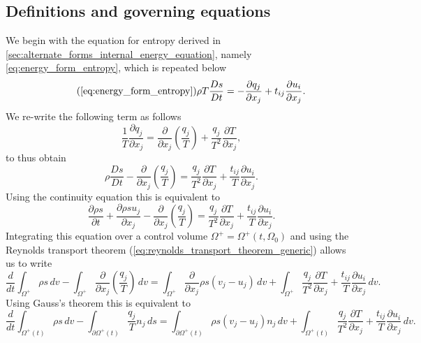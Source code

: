 \documentclass[oneside,a4paper,11pt]{report}
\begin{document}
\subsection{Definitions and governing equations}
We begin with the equation for entropy derived in \cref{sec:alternate_forms_internal_energy_equation}, namely \cref{eq:energy_form_entropy}, which is repeated below
\begin{equation}
\tag{\ref{eq:energy_form_entropy}}
    \rho T \frac{Ds}{Dt} = -\frac{\partial q_j}{\partial x_j} + t_{ij} \frac{\partial u_i}{\partial x_j}.
\end{equation}
We re-write the following term as follows
\begin{equation*}
    \frac{1}{T} \frac{\partial q_j}{\partial x_j} = \frac{\partial}{\partial x_j} \left ( \frac{q_j}{T} \right ) + \frac{q_j}{T^2}\frac{\partial T}{\partial x_j},
\end{equation*}
to thus obtain
\begin{equation*}
    \rho \frac{Ds}{Dt} - \frac{\partial}{\partial x_j} \left ( \frac{q_j}{T} \right ) = \frac{q_j}{T^2}\frac{\partial T}{\partial x_j} + \frac{t_{ij}}{T} \frac{\partial u_i}{\partial x_j}.
\end{equation*}
Using the continuity equation this is equivalent to
\begin{equation*}
    \frac{\partial \rho s}{\partial t} + \frac{\partial \rho s u_j}{\partial x_j} - \frac{\partial}{\partial x_j} \left ( \frac{q_j}{T} \right ) = \frac{q_j}{T^2}\frac{\partial T}{\partial x_j} + \frac{t_{ij}}{T} \frac{\partial u_i}{\partial x_j}.
\end{equation*}
Integrating this equation over a control volume $\Omega^+ = \Omega^+(t,\Omega_0)$ and using the Reynolds transport theorem (\cref{eq:reynolds_transport_theorem_generic}) allows us to write
\begin{equation*}
    \frac{d}{dt} \int_{\Omega^+} \rho s \, dv - \int_{\Omega^+} \frac{\partial}{\partial x_j} \left ( \frac{q_j}{T} \right ) \,dv = \int_{\Omega^+} \frac{\partial}{\partial x_j} \rho s \left (v_j - u_j \right ) \, dv + \int_{\Omega^+} \frac{q_j}{T^2}\frac{\partial T}{\partial x_j} + \frac{t_{ij}}{T} \frac{\partial u_i}{\partial x_j} \, dv.
\end{equation*}
Using Gauss's theorem this is equivalent to
\begin{equation*}
    \frac{d}{dt} \int_{\Omega^+(t)} \rho s \, dv - \int_{\partial \Omega^+(t)} \frac{q_j}{T} n_j \,ds = \int_{\partial \Omega^+(t)} \rho s \left (v_j - u_j \right ) n_j \, dv + \int_{\Omega^+(t)} \frac{q_j}{T^2}\frac{\partial T}{\partial x_j} + \frac{t_{ij}}{T} \frac{\partial u_i}{\partial x_j} \, dv.
\end{equation*}
\end{document}
